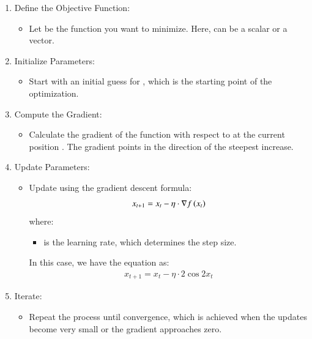 \documentclass[journal]{IEEEtran}
\begin{document}
\begin{enumerate}
    \item Define the Objective Function:
    \begin{itemize}
        \item Let  be the function you want to minimize. Here,  can be a scalar or a vector.
    \end{itemize}

    \item Initialize Parameters:
    \begin{itemize}
        \item Start with an initial guess for , which is the starting point of the optimization.
    \end{itemize}

    \item Compute the Gradient:
    \begin{itemize}
        \item Calculate the gradient  of the function with respect to  at the current position . The gradient points in the direction of the steepest increase.
    \end{itemize}

    \item Update Parameters:
    \begin{itemize}
        \item Update  using the gradient descent formula:
        \begin{align}
            x_{t+1} = x_t - \eta \cdot \nabla f\left(x_t\right)
        \end{align}
        where:
        \begin{itemize}
            \item \brak{\eta} is the learning rate, which determines the step size.
        \end{itemize}
        In this case, we have the equation as:
        \begin{align}
		x_{t+1}=x_t- \eta \cdot 2\cos{2x_t}
	\end{align}

    \end{itemize}

    \item Iterate:
    \begin{itemize}
        \item Repeat the process until convergence, which is achieved when the updates become very small or the gradient approaches zero.
    \end{itemize}
\end{enumerate}
\end{document}
